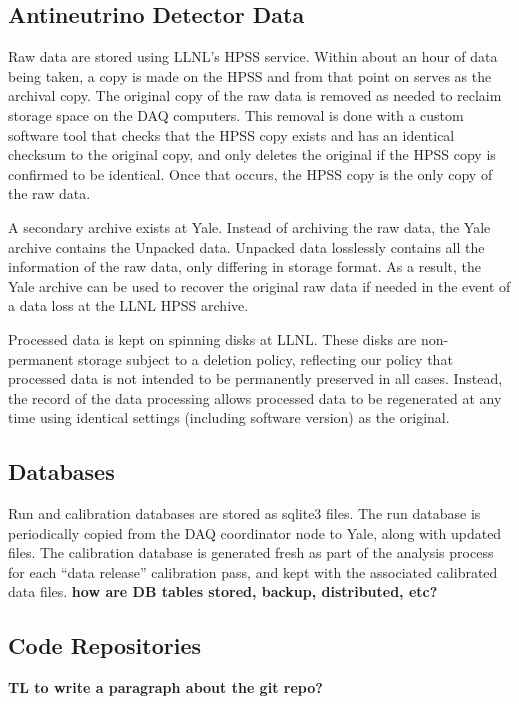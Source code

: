 \subsection{Antineutrino Detector Data}

Raw data are stored using LLNL's HPSS service.
Within about an hour of data being taken, a copy is made on the HPSS and from that point on serves as the archival copy.
The original copy of the raw data is removed as needed to reclaim storage space on the DAQ computers.
This removal is done with a custom software tool that checks that the HPSS copy exists and has an identical checksum to the original copy,
	and only deletes the original if the HPSS copy is confirmed to be identical.
Once that occurs, the HPSS copy is the only copy of the raw data.

A secondary archive exists at Yale.
Instead of archiving the raw data, the Yale archive contains the Unpacked data.
Unpacked data losslessly contains all the information of the raw data, only differing in storage format.
As a result, the Yale archive can be used to recover the original raw data if needed in the event of a data loss at the LLNL HPSS archive.

Processed data is kept on spinning disks at LLNL.
These disks are non-permanent storage subject to a deletion policy, reflecting our policy that processed data is not intended to be permanently preserved in all cases.
Instead, the record of the data processing allows processed data to be regenerated at any time using identical settings (including software version) as the original.



\subsection{Databases}

Run and calibration databases are stored as sqlite3 files.
The run database is periodically copied from the DAQ coordinator node to Yale, along with updated files.
The calibration database is generated fresh as part of the analysis process for each ``data release'' calibration pass,
	and kept with the associated calibrated data files.
\textbf{how are DB tables stored, backup, distributed, etc?}

\subsection{Code Repositories}

\textbf{TL to write a paragraph about the git repo?}
